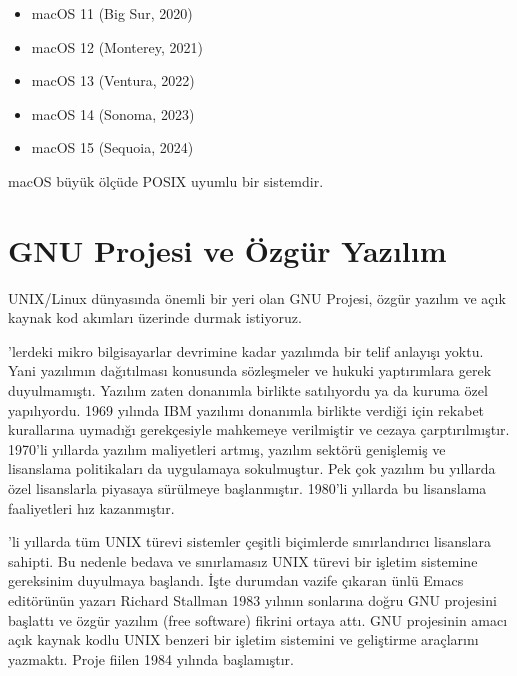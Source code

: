 \documentclass[a4paper,10pt,turkish]{sphinxmanual}
\begin{document}
\begin{itemize}
\item {} 
\sphinxAtStartPar
macOS 11 (Big Sur, 2020)

\item {} 
\sphinxAtStartPar
macOS 12 (Monterey, 2021)

\item {} 
\sphinxAtStartPar
macOS 13 (Ventura, 2022)

\item {} 
\sphinxAtStartPar
macOS 14 (Sonoma, 2023)

\item {} 
\sphinxAtStartPar
macOS 15 (Sequoia, 2024)

\end{itemize}

\sphinxAtStartPar
macOS büyük ölçüde POSIX uyumlu bir sistemdir.


\section{GNU Projesi ve Özgür Yazılım}
\label{\detokenize{introduction:gnu-projesi-ve-ozgur-yazilim}}
\sphinxAtStartPar
UNIX/Linux dünyasında önemli bir yeri olan GNU Projesi, özgür yazılım ve açık kaynak kod
akımları üzerinde durmak istiyoruz.

’lerdeki mikro bilgisayarlar devrimine kadar yazılımda bir telif anlayışı yoktu. Yani
yazılımın dağıtılması konusunda sözleşmeler ve hukuki yaptırımlara gerek duyulmamıştı.
Yazılım zaten donanımla birlikte satılıyordu ya da kuruma özel yapılıyordu. 1969 yılında
IBM yazılımı donanımla birlikte verdiği için rekabet kurallarına uymadığı gerekçesiyle
mahkemeye verilmiştir ve cezaya çarptırılmıştır. 1970’li yıllarda yazılım maliyetleri
artmış, yazılım sektörü genişlemiş ve lisanslama politikaları da uygulamaya sokulmuştur.
Pek çok yazılım bu yıllarda özel lisanslarla piyasaya sürülmeye başlanmıştır. 1980’li
yıllarda bu lisanslama faaliyetleri hız kazanmıştır.

’li yıllarda tüm UNIX türevi sistemler çeşitli biçimlerde sınırlandırıcı lisanslara
sahipti. Bu nedenle bedava ve sınırlamasız UNIX türevi bir işletim sistemine gereksinim
duyulmaya başlandı. İşte durumdan vazife çıkaran ünlü Emacs editörünün yazarı Richard
Stallman 1983 yılının sonlarına doğru GNU projesini başlattı ve özgür yazılım (free
software) fikrini ortaya attı. GNU projesinin amacı açık kaynak kodlu UNIX benzeri bir
işletim sistemini ve geliştirme araçlarını yazmaktı. Proje fiilen 1984 yılında başlamıştır.
\end{document}
